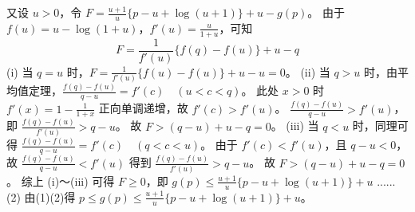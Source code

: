 \begin{questions}
\begin{parts}
\begin{solution}
        又设 $u > 0$，令 $F = \frac{u+1}{u} \{ p - u + \log(u+1) \} + u - g(p)$。
        由于 $f(u) = u - \log(1+u)$，$f'(u) = \frac{u}{1+u}$，可知
        \[
        F = \frac{1}{f'(u)} \{ f(q) - f(u) \} + u - q
        \]
        (i) 当 $q = u$ 时，$F = \frac{1}{f'(u)} \{ f(u) - f(u) \} + u - u = 0$。
        (ii) 当 $q > u$ 时，由平均值定理，$\frac{f(q) - f(u)}{q - u} = f'(c) \quad (u < c < q)$。
        此处 $x > 0$ 时 $f'(x) = 1 - \frac{1}{1+x}$ 正向单调递增，故 $f'(c) > f'(u)$。
        $\frac{f(q) - f(u)}{q - u} > f'(u)$，即 $\frac{f(q) - f(u)}{f'(u)} > q - u$。
        故 $F > (q - u) + u - q = 0$。
        (iii) 当 $q < u$ 时，同理可得 $\frac{f(q) - f(u)}{q - u} = f'(c) \quad (q < c < u)$。
        由于 $f'(c) < f'(u)$，且 $q - u < 0$，故 $\frac{f(q) - f(u)}{q - u} < f'(u)$ 得到 $\frac{f(q) - f(u)}{f'(u)} > q - u$。
        故 $F > (q - u) + u - q = 0$。
        综上 (i)～(iii) 可得 $F \ge 0$，即 $g(p) \le \frac{u+1}{u} \{ p - u + \log(u+1) \} + u$ ......(2)
        由(1)(2)得 $p \le g(p) \le \frac{u+1}{u} \{ p - u + \log(u+1) \} + u$。
    \end{solution}


\end{parts}
\end{questions}
